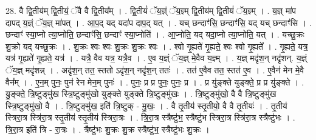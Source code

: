 \documentclass[17pt]{extarticle}
\begin{document}
28. वै द्वि॒तीय॑म् द्वि॒तीयं॒ ॅवै वै द्वि॒तीय᳚म् । . द्वि॒तीयं॑ ॅय॒ज्ञ्ं ॅय॒ज्ञ्म् द्वि॒तीय॑म् द्वि॒तीयं॑ ॅय॒ज्ञ्म् । . य॒ज्ञ् मा॑प दापद् य॒ज्ञ्ं ॅय॒ज्ञ् मा॑पत् । . आ॒प॒द् यद् यदा॑प दाप॒द् यत् । . यच् छन्दाꣳ॑सि॒ छन्दाꣳ॑सि॒ यद् यच् छन्दाꣳ॑सि । . छन्दाꣳ॑ स्या॒प्नो त्या॒प्नोति॒ छन्दाꣳ॑सि॒ छन्दाꣳ॑ स्या॒प्नोति॑ । . आ॒प्नोति॒ यद् यदा॒प्नो त्या॒प्नोति॒ यत् । . यच्छु॒क्रः शु॒क्रो यद् यच्छु॒क्रः । . शु॒क्रः श्वः श्वः शु॒क्रः शु॒क्रः श्वः । . श्वो गृ॒ह्यते॑ गृ॒ह्यते॒ श्वः श्वो गृ॒ह्यते᳚ । . गृ॒ह्यते॒ यत्र॒ यत्र॑ गृ॒ह्यते॑ गृ॒ह्यते॒ यत्र॑ । . यत्रै॒ वैव यत्र॒ यत्रै॒व । . ए॒व य॒ज्ञ्ं ॅय॒ज्ञ् मे॒वैव य॒ज्ञ्म् । . य॒ज्ञ् मदृ॑श॒न् नदृ॑शन्. य॒ज्ञ्ं ॅय॒ज्ञ् मदृ॑शन्न् । . अदृ॑श॒न् तत॒ स्ततो ऽदृ॑श॒न् नदृ॑श॒न् ततः॑ । . तत॑ ए॒वैव तत॒ स्तत॑ ए॒व । . ए॒वैन॑ मेन मे॒वै वैन᳚म् । . ए॒न॒म् पुनः॒ पुन॑ रेन मेन॒म् पुनः॑ । . पुनः॒ प्र प्र पुनः॒ पुनः॒ प्र । . प्र यु॑ङ्क्ते युङ्क्ते॒ प्र प्र यु॑ङ्क्ते । . यु॒ङ्क्ते॒ त्रि॒ष्टुङ्‌मु॑ख स्त्रि॒ष्टुङ्‌मु॑खो युङ्क्ते युङ्क्ते त्रि॒ष्टुङ्‌मु॑खः । . त्रि॒ष्टुङ्‌मु॑खो॒ वै वै त्रि॒ष्टुङ्‌मु॑ख स्त्रि॒ष्टुङ्‌मु॑खो॒ वै । . त्रि॒ष्टुङ्‌मु॑ख॒ इति॑ त्रि॒ष्टुक् - मु॒खः॒ । . वै तृ॒तीय॑ स्तृ॒तीयो॒ वै वै तृ॒तीयः॑ । . तृ॒तीय॑ स्त्रिरा॒त्र स्त्रि॑रा॒त्र स्तृ॒तीय॑ स्तृ॒तीय॑ स्त्रिरा॒त्रः । . त्रि॒रा॒त्र स्त्रैष्टु॑भ॒ स्त्रैष्टु॑भ स्त्रिरा॒त्र स्त्रि॑रा॒त्र स्त्रैष्टु॑भः । . त्रि॒रा॒त्र इति॑ त्रि - रा॒त्रः । . त्रैष्टु॑भः शु॒क्रः शु॒क्र स्त्रैष्टु॑भ॒ स्त्रैष्टु॑भः शु॒क्रः । \newline
\end{document}
